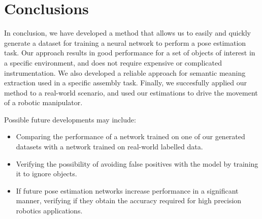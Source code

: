 \chapter{Conclusions}

In conclusion, we have developed a method that allows us to easily and quickly generate a dataset for training a neural network to perform a pose estimation task. Our approach results in good performance for a set of objects of interest in a specific environment, and does not require expensive or complicated instrumentation. We also developed a reliable approach for semantic meaning extraction used in a specific assembly task. Finally, we succesfully applied our method to a real-world scenario, and used our estimations to drive the movement of a robotic manipulator.

Possible future developments may include:
\begin{itemize}
    \item Comparing the performance of a network trained on one of our generated datasets with a network trained on real-world labelled data.
    \item Verifying the possibility of avoiding false positives with the model by training it to ignore objects.
    \item If future pose estimation networks increase performance in a significant manner, verifying if they obtain the accuracy required for high precision robotics applications.
\end{itemize}